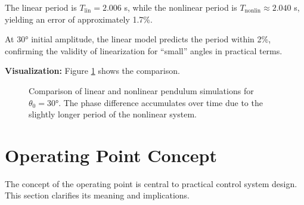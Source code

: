 The linear period is $T_{\text{lin}} = 2.006$ s, while the nonlinear period is $T_{\text{nonlin}} \approx 2.040$ s, yielding an error of approximately 1.7\%.

At $30°$ initial amplitude, the linear model predicts the period within 2\%, confirming the validity of linearization for ``small'' angles in practical terms.

\textbf{Visualization:} Figure \ref{fig:simulation_comparison} shows the comparison.

\begin{figure}[htbp]
\centering
{}
\caption{Comparison of linear and nonlinear pendulum simulations for $\theta_0 = 30°$. The phase difference accumulates over time due to the slightly longer period of the nonlinear system.}
\label{fig:simulation_comparison}
\end{figure}

\section{Operating Point Concept}
\label{sec:operating_point}

The concept of the operating point is central to practical control system design. This section clarifies its meaning and implications.

